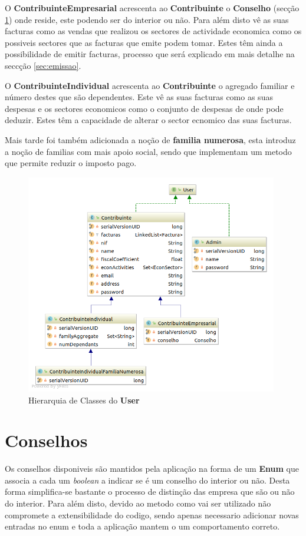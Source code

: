 \documentclass[12pt,a4paper]{report}
\begin{document}
    O \textbf{ContribuinteEmpresarial} acrescenta ao \textbf{Contribuinte}
    o \textbf{Conselho} (secção \ref{sec:conselho}) onde reside, este podendo
    ser do interior ou não. Para além disto vê as suas facturas como as vendas
    que realizou os sectores de actividade economica como os possiveis sectores
    que as facturas que emite podem tomar. Estes têm ainda a possibilidade de
    emitir facturas, processo que será explicado em mais detalhe na seccção
     \ref{sec:emissao}.

    O \textbf{ContribuinteIndividual} acrescenta ao \textbf{Contribuinte}
    o agregado familiar e número destes que são dependentes. Este vê as suas
    facturas como as suas despesas e os sectores economicos como o conjunto
    de despesas de onde pode deduzir. Estes têm a capacidade de alterar o
    sector ecnomico das suas facturas.

    Mais tarde foi também adicionada a noção de \textbf{familia numerosa}, esta
    introduz a noção de familias com mais apoio social, sendo que implementam um
    metodo que permite reduzir o imposto pago.

    \begin{figure}[H]
        \centering
        \includegraphics[width=11cm]{./images/UserHierarquy.png}
        \caption{Hierarquia de Classes do \textbf{User}}\label{fig:Hierarquia}
    \end{figure}

\section{Conselhos}
\label{sec:conselho}
    Os conselhos disponiveis são mantidos pela aplicação na forma de um
    \textbf{Enum} que associa a cada um \textit{boolean} a indicar se é um
    conselho do interior ou não. Desta forma simplifica-se bastante o processo
    de distinção das empresa que são ou não do interior. Para além disto, devido
    ao metodo como vai ser utilizado não compromete a extensibilidade do codigo,
    sendo apenas necessario adicionar novas entradas no enum e toda a aplicação
    mantem o um comportamento correto.
\end{document}
